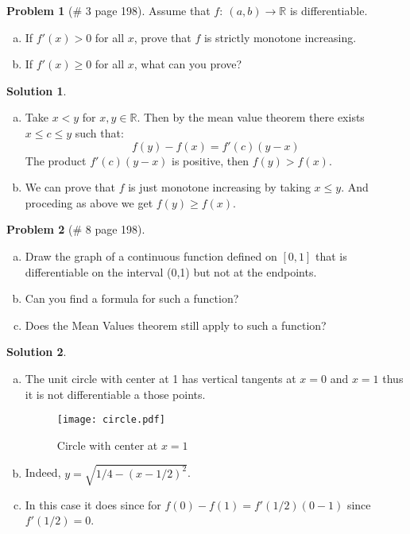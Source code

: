 \documentclass{article}
\theoremstyle{definition}
\newtheorem*{soln}{Solution}
\newtheorem*{prob}{Problem}
\theoremstyle{theorem}
\newcommand{\R}{\mathbb{R}}
\begin{document}
\begin{prob}[\# 3 page 198]
    Assume that $f: \ (a,b) \to  \R$ is differentiable.
    \begin{enumerate}[(a)]
        \item If $f'(x)>0$ for all $x$, prove that $f$ is strictly monotone increasing.
        \item If $f'(x) \geq 0$ for all $x$, what can you prove?
    \end{enumerate}
\end{prob}
\begin{soln}
    \begin{enumerate}[(a)]
        \item Take $x<y $ for $x,y\in \R$. Then by the mean value theorem there exists $x\leq c \leq y$ such that:
            $$f(y) - f(x) = f'(c)(y-x)$$
            The product $f'(c) (y-x)$ is positive, then $f(y) > f(x)$.
        \item We can prove that $f$ is just monotone increasing by taking $x\leq y$. And proceding as above we get $f(y) \geq f(x)$.
    \end{enumerate}
 \end{soln}

\vspace{1in}



\begin{prob}[\# 8 page 198]
    \begin{enumerate}[(a)]
        \item Draw the graph of a continuous function defined on $[0,1]$ that is differentiable on the interval (0,1) but not at the endpoints.
        \item Can you find a formula for such a function?
        \item Does the Mean Values theorem still apply to such a function?
    \end{enumerate}
\end{prob}
\begin{soln}
    \begin{enumerate}[(a)]
        \item The unit circle with center at 1 has vertical tangents at $x=0$ and $x=1$ thus it is not differentiable a those points.

            \begin{figure}
  \centering
    \texttt{[image: circle.pdf]}
  \caption{Circle with center at $x=1$}
\end{figure}
\item Indeed, $y = \sqrt{1/4 - (x-1/2)^2}$.
\item In this case it does since for $f(0)-f(1) = f'(1/2)(0-1)$ since $f'(1/2)=0$.
    \end{enumerate}
\end{soln}
\vspace{1in}
\end{document}
